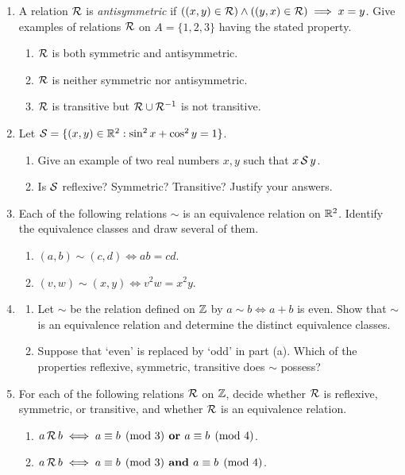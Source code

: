 \begin{exercises}{}{}

\begin{enumerate}
	\item A relation $\mathcal{R}$ is \emph{antisymmetric} if $((x,y)\in \mathcal{R})\wedge((y,x)\in \mathcal{R})\implies x=y$. Give examples of relations $\mathcal{R}$ on $A=\{1,2,3\}$ having the stated property.
	\begin{enumerate}
		\item $\mathcal{R}$ is both symmetric and antisymmetric.
		\item $\mathcal{R}$ is neither symmetric nor antisymmetric.
		\item $\mathcal{R}$ is transitive but $\mathcal{R}\cup \mathcal{R}^{-1}$ is not transitive.
	\end{enumerate}
	
	\item Let $\mathcal{S}=\{(x,y)\in\mathbb{R}^2:\sin^2x+\cos^2y=1\}$.
	\begin{enumerate}
	  \item Give an example of two real numbers $x,y$ such that $x\,\mathcal{S}\,y$.
	  \item Is $\mathcal{S}$ reflexive? Symmetric? Transitive? Justify your answers.
	\end{enumerate}

	\item Each of the following relations $\sim$ is an equivalence relation on $\mathbb{R}^2$. Identify the equivalence classes and draw several of them.
	\begin{enumerate}
		\item $(a,b)\sim(c,d)\iff ab=cd$.
	  \item $(v,w)\sim(x,y)\iff v^2w=x^2y$.
	\end{enumerate}
	
  \item\begin{enumerate}
  \item Let $\sim$ be the relation defined on $\mathbb{Z}$ by $a\sim b\iff a+b$ is even. Show that $\sim$ is an equivalence relation and determine the distinct equivalence classes.
  \item Suppose that `even' is replaced by `odd' in part (a). Which of the properties reflexive, symmetric, transitive does $\sim$ possess?
  \end{enumerate}

  \item For each of the following relations $\mathcal{R}$ on $\mathbb{Z}$, decide whether $\mathcal{R}$ is reflexive, symmetric, or transitive, and whether $\mathcal{R}$ is an equivalence relation.
	\begin{enumerate}
		\item $a\,\mathcal{R}\,b \iff a\equiv b\pmod 3 \textbf{ or } a\equiv b\pmod 4$.
		\item $a\,\mathcal{R}\,b \iff a\equiv b\pmod 3 \textbf{ and } a\equiv b\pmod 4$.
	\end{enumerate}


\end{enumerate}
\end{exercises}
